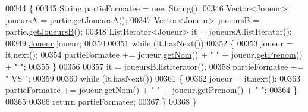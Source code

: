 \begin{DoxyCode}
00344     \{
00345         String partieFormatee = \textcolor{keyword}{new} String();
00346         Vector<Joueur> joueursA = partie.\hyperlink{classcom_1_1example_1_1area_1_1_partie_a0f944de317206d9b99f9ffc7146a43ef}{getJoueursA}();
00347         Vector<Joueur> joueursB = partie.\hyperlink{classcom_1_1example_1_1area_1_1_partie_a3c6b981de54d03eeb553919983ee3be8}{getJoueursB}();
00348         ListIterator<Joueur> it = joueursA.listIterator();
00349         \hyperlink{classcom_1_1example_1_1area_1_1_joueur}{Joueur} joueur;
00350 
00351         \textcolor{keywordflow}{while} (it.hasNext())
00352         \{
00353             joueur = it.next();
00354             partieFormatee += joueur.\hyperlink{classcom_1_1example_1_1area_1_1_joueur_a4e43a9187363501204af7b2f2c84a9a4}{getNom}() + \textcolor{stringliteral}{" "} + joueur.\hyperlink{classcom_1_1example_1_1area_1_1_joueur_ac2cd099ccfc34c48fbabde5649514a27}{getPrenom}() + \textcolor{stringliteral}{" "};
00355         \}
00356 
00357         it = joueursB.listIterator();
00358         partieFormatee += \textcolor{stringliteral}{" VS  "};
00359 
00360         \textcolor{keywordflow}{while} (it.hasNext())
00361         \{
00362             joueur = it.next();
00363             partieFormatee += joueur.\hyperlink{classcom_1_1example_1_1area_1_1_joueur_a4e43a9187363501204af7b2f2c84a9a4}{getNom}() + \textcolor{stringliteral}{" "} + joueur.\hyperlink{classcom_1_1example_1_1area_1_1_joueur_ac2cd099ccfc34c48fbabde5649514a27}{getPrenom}() + \textcolor{stringliteral}{" "};
00364         \}
00365 
00366         \textcolor{keywordflow}{return} partieFormatee;
00367     \}
00368 \}
\end{DoxyCode}
